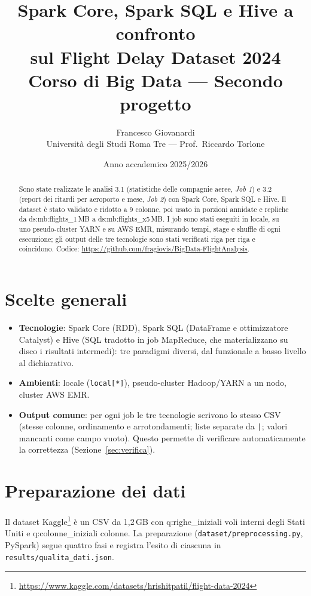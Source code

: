 \documentclass[11pt,a4paper]{article}
\title{\vspace{-1.2cm}\textbf{Spark Core, Spark SQL e Hive a confronto\\ sul Flight Delay Dataset 2024}\\[3pt]
\large Corso di Big Data --- Secondo progetto}
\author{Francesco Giovanardi\\ \small Università degli Studi Roma Tre --- Prof.\ Riccardo Torlone}
\date{Anno accademico 2025/2026}
\newcommand{\Q}[1]{\csname q:#1\endcsname}
\newcommand{\DS}[2]{\csname ds:#1:#2\endcsname}
\newcommand{\repo}{https://github.com/fragiovis/BigData-FlightAnalysis}
\newcommand{\code}[1]{\texttt{#1}}
\begin{document}
\maketitle
\vspace{-0.6cm}

\begin{abstract}
\noindent Sono state realizzate le analisi 3.1 (statistiche delle compagnie aeree, \emph{Job 1}) e 3.2 (report dei
ritardi per aeroporto e mese, \emph{Job 2}) con Spark Core, Spark SQL e Hive. Il dataset è stato validato e ridotto
a 9 colonne, poi usato in porzioni annidate e repliche da \DS{mb}{flights_1}\,MB a \DS{mb}{flights_x5}\,MB. I job sono
stati eseguiti in locale, su uno pseudo-cluster YARN e su AWS EMR, misurando tempi, stage e shuffle di ogni
esecuzione; gli output delle tre tecnologie sono stati verificati riga per riga e coincidono.
Codice: \url{\repo}.
\end{abstract}

\section{Scelte generali}
\begin{itemize}
  \item \textbf{Tecnologie}: Spark Core (RDD), Spark SQL (DataFrame e ottimizzatore Catalyst) e Hive (SQL tradotto in
        job MapReduce, che materializzano su disco i risultati intermedi): tre paradigmi diversi, dal
        funzionale a basso livello al dichiarativo.
  \item \textbf{Ambienti}: locale (\code{local[*]}), pseudo-cluster Hadoop/YARN a un nodo, cluster AWS EMR.
  \item \textbf{Output comune}: per ogni job le tre tecnologie scrivono lo stesso CSV (stesse colonne, ordinamento e
        arrotondamenti; liste separate da \code{|}; valori mancanti come campo vuoto). Questo permette di
        verificare automaticamente la correttezza (Sezione~\ref{sec:verifica}).
\end{itemize}

\section{Preparazione dei dati}\label{sec:preparazione}
Il dataset Kaggle\footnote{\url{https://www.kaggle.com/datasets/hrishitpatil/flight-data-2024}} è un CSV da 1,2\,GB
con \Q{righe_iniziali} voli interni degli Stati Uniti e \Q{colonne_iniziali} colonne. La preparazione
(\code{dataset/preprocessing.py}, PySpark) segue quattro fasi e registra l'esito di ciascuna in
\code{results/qualita\_dati.json}.
\end{document}
